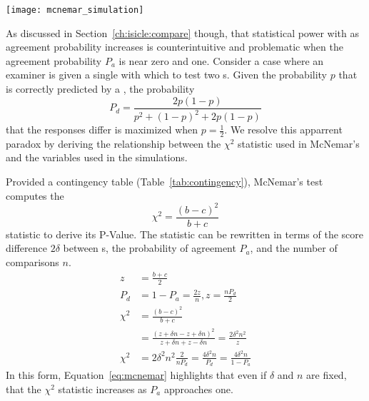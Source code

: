 \begin{figure*}[th]
    \centering
    \texttt{[image: mcnemar\_simulation]}
    \caption{
    }
    \label{fig:mcnemar-sim}
\end{figure*}

As discussed in Section~\ref{ch:isicle:compare} though, that statistical power  with as agreement probability increases is counterintuitive and problematic when the agreement probability $P_a$ is near zero and one.
Consider a case where an examiner is given a single \itm{} with which to test two \subj{}s.
Given the probability $p$ that \itm{} is correctly predicted by a \subj{}, the probability
\begin{equation}
    P_d=\frac{2p(1-p)}{p^2+(1-p)^2+2p(1-p)}
\end{equation}
that the \subj{} responses differ is maximized when $p=\frac{1}{2}$.
We resolve this apparrent paradox by deriving the relationship between the $\chi^2$ statistic used in McNemar's and the variables used in the simulations.

Provided a contingency table (Table~\ref{tab:contingency}), McNemar's test computes the
\begin{equation}
    \chi^2=\frac{(b-c)^2}{b+c}
\end{equation}
statistic to derive its P-Value.
The statistic can be rewritten in terms of the score difference $2\delta$ between \subj{}s, the probability of agreement $P_a$, and the number of comparisons $n$.
\begin{align}
    z      & =\frac{b+c}{2}                                                                                                      \\
    P_d    & = 1-P_a =\frac{2z}{n}                                                                            , z=\frac{nP_d}{2} \\
    \chi^2 & =\frac{(b-c)^2}{b+c}                                                                                                \\
           & =\frac{(z+\delta n - z + \delta n)^2}{z+\delta n + z - \delta n}=\frac{2\delta^2 n^2}{z}                            \\
    \chi^2 & =2\delta^2 n^2\frac{2}{nP_d}=\frac{4\delta^2 n}{P_d}=\frac{4\delta^2 n}{1-P_a}\label{eq:mcnemar}
\end{align}
In this form, Equation~\ref{eq:mcnemar} highlights that even if $\delta$ and $n$ are fixed, that the $\chi^2$ statistic increases as $P_a$ approaches one.

